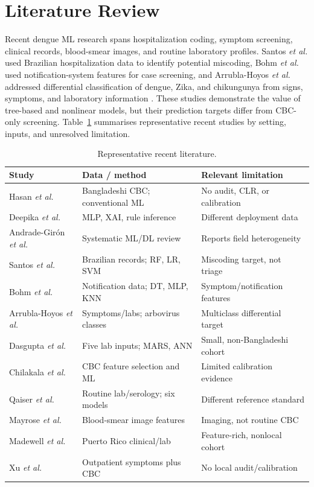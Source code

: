\documentclass[conference]{IEEEtran}
\begin{document}
\section{Literature Review}

Recent dengue ML research spans hospitalization coding, symptom screening,
clinical records, blood-smear images, and routine laboratory profiles. Santos
\emph{et al.} used Brazilian hospitalization data to identify potential
miscoding, Bohm \emph{et al.} used notification-system features for case
screening, and Arrubla-Hoyos \emph{et al.} addressed differential
classification of dengue, Zika, and chikungunya from signs, symptoms, and
laboratory information \cite{santos2023,bohm2024,arrubla2024}. These studies
demonstrate the value of tree-based and nonlinear models, but their prediction
targets differ from CBC-only screening. Table~\ref{tab:lit} summarises
representative recent studies by setting, inputs, and unresolved limitation.

\begin{table}[!t]
\caption{Representative recent literature.}
\label{tab:lit}
\centering\footnotesize
\setlength{\tabcolsep}{3pt}
\begin{tabular}{|p{}|p{}|p{}|}
\hline
\textbf{Study} & \textbf{Data / method} & \textbf{Relevant limitation}\\\hline
Hasan \emph{et al.} \cite{hasan2026} & Bangladeshi CBC; conventional ML & No audit, CLR, or calibration\\\hline
Deepika \emph{et al.} \cite{deepika2025} & MLP, XAI, rule inference & Different deployment data\\\hline
Andrade-Gir\'on \emph{et al.} \cite{andrade2025} & Systematic ML/DL review & Reports field heterogeneity\\\hline
Santos \emph{et al.} \cite{santos2023} & Brazilian records; RF, LR, SVM & Miscoding target, not triage\\\hline
Bohm \emph{et al.} \cite{bohm2024} & Notification data; DT, MLP, KNN & Symptom/notification features\\\hline
Arrubla-Hoyos \emph{et al.} \cite{arrubla2024} & Symptoms/labs; arbovirus classes & Multiclass differential target\\\hline
Dasgupta \emph{et al.} \cite{dasgupta2025} & Five lab inputs; MARS, ANN & Small, non-Bangladeshi cohort\\\hline
Chilakala \emph{et al.} \cite{chilakala2025} & CBC feature selection and ML & Limited calibration evidence\\\hline
Qaiser \emph{et al.} \cite{qaiser2024} & Routine lab/serology; six models & Different reference standard\\\hline
Mayrose \emph{et al.} \cite{mayrose2023} & Blood-smear image features & Imaging, not routine CBC\\\hline
Madewell \emph{et al.} \cite{madewell2025} & Puerto Rico clinical/lab & Feature-rich, nonlocal cohort\\\hline
Xu \emph{et al.} \cite{xu2026} & Outpatient symptoms plus CBC & No local audit/calibration\\\hline
\end{tabular}
\end{table}
\end{document}
